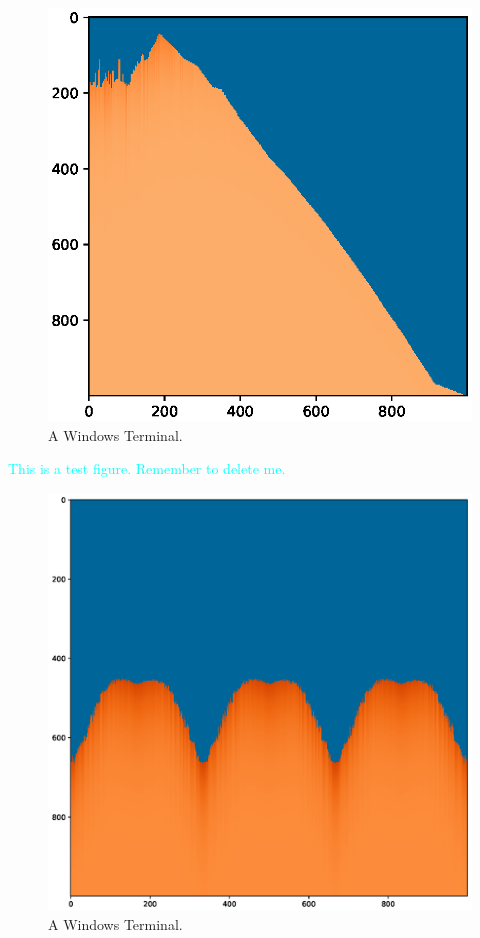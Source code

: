 \documentclass[12pt]{article}
\begin{document}
\begin{figure}[H]
	\includegraphics[width=\linewidth]{Figure_1.eps}
	\caption{A Windows Terminal.}
	\label{fig:Terminal}
\end{figure}
\textcolor{cyan}{This is a test figure. Remember to delete me.}
\begin{figure}[H]
	\includegraphics[width=\linewidth]{Figure_2.eps}
	\caption{A Windows Terminal.}
	\label{fig:Terminal}
\end{figure}
\end{document}
